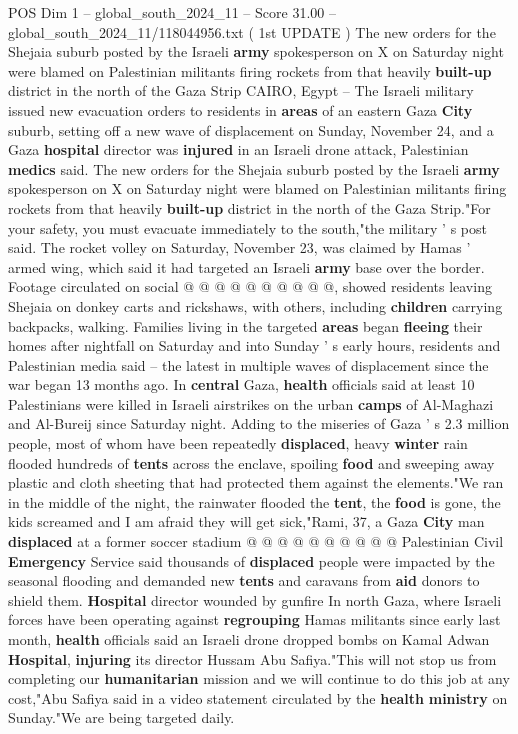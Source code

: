 \begin{textsample}{POS Dim 1 – global\_south\_2024\_11 – Score 31.00 – global\_south\_2024\_11/118044956.txt}  \label{ex:f1_pos_245}
( 1st UPDATE ) The new orders for the Shejaia suburb posted by the Israeli \textbf{army} spokesperson on X on Saturday night were blamed on Palestinian militants firing rockets from that heavily \textbf{built-up} district in the north of the Gaza Strip CAIRO, Egypt -- The Israeli military issued new evacuation orders to residents in \textbf{areas} of an eastern Gaza \textbf{City} suburb, setting off a new wave of displacement on Sunday, November 24, and a Gaza \textbf{hospital} director was \textbf{injured} in an Israeli drone attack, Palestinian \textbf{medics} said.
The new orders for the Shejaia suburb posted by the Israeli \textbf{army} spokesperson on X on Saturday night were blamed on Palestinian militants firing rockets from that heavily \textbf{built-up} district in the north of the Gaza Strip."For your safety, you must evacuate immediately to the south,"the military ' s post said.
The rocket volley on Saturday, November 23, was claimed by Hamas ' armed wing, which said it had targeted an Israeli \textbf{army} base over the border.
Footage circulated on social @ @ @ @ @ @ @ @ @ @, showed residents leaving Shejaia on donkey carts and rickshaws, with others, including \textbf{children} carrying backpacks, walking.
Families living in the targeted \textbf{areas} began \textbf{fleeing} their homes after nightfall on Saturday and into Sunday ' s early hours, residents and Palestinian media said -- the latest in multiple waves of displacement since the war began 13 months ago.
In \textbf{central} Gaza, \textbf{health} officials said at least 10 Palestinians were killed in Israeli airstrikes on the urban \textbf{camps} of Al-Maghazi and Al-Bureij since Saturday night.
Adding to the miseries of Gaza ' s 2.3 million people, most of whom have been repeatedly \textbf{displaced}, heavy \textbf{winter} rain flooded hundreds of \textbf{tents} across the enclave, spoiling \textbf{food} and sweeping away plastic and cloth sheeting that had protected them against the elements."We ran in the middle of the night, the rainwater flooded the \textbf{tent}, the \textbf{food} is gone, the kids screamed and I am afraid they will get sick,"Rami, 37, a Gaza \textbf{City} man \textbf{displaced} at a former soccer stadium @ @ @ @ @ @ @ @ @ @ Palestinian Civil \textbf{Emergency} Service said thousands of \textbf{displaced} people were impacted by the seasonal flooding and demanded new \textbf{tents} and caravans from \textbf{aid} donors to shield them. \textbf{Hospital} director wounded by gunfire In north Gaza, where Israeli forces have been operating against \textbf{regrouping} Hamas militants since early last month, \textbf{health} officials said an Israeli drone dropped bombs on Kamal Adwan \textbf{Hospital}, \textbf{injuring} its director Hussam Abu Safiya."This will not stop us from completing our \textbf{humanitarian} mission and we will continue to do this job at any cost,"Abu Safiya said in a video statement circulated by the \textbf{health} \textbf{ministry} on Sunday."We are being targeted daily.

\end{textsample}
